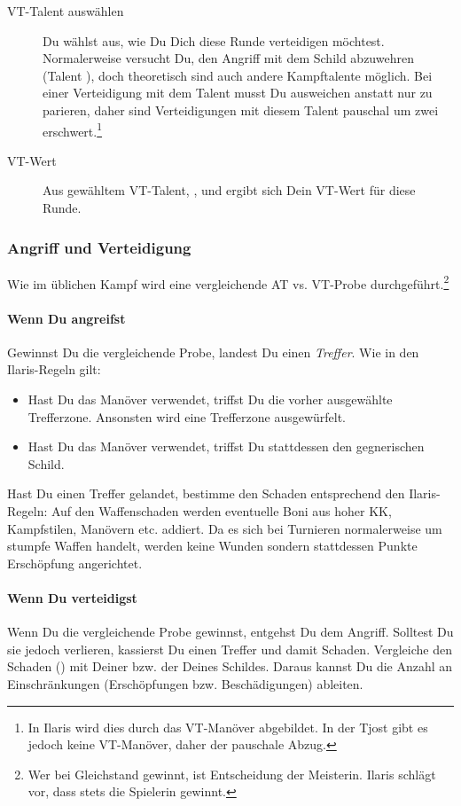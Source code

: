 \documentclass[12pt,div=calc,a5paper,parskip=half]{scrartcl}
\begin{document}
\begin{description}
    \item[VT-Talent auswählen] Du wählst aus, wie Du Dich diese Runde verteidigen möchtest. Normalerweise versucht Du, den Angriff mit dem Schild abzuwehren (Talent ), doch theoretisch sind auch andere Kampftalente möglich. Bei einer Verteidigung mit dem Talent  musst Du ausweichen anstatt nur zu parieren, daher sind Verteidigungen mit diesem Talent pauschal um zwei erschwert.\footnote{In Ilaris wird dies durch das VT-Manöver  abgebildet. In der Tjost gibt es jedoch keine VT-Manöver, daher der pauschale Abzug.}
    \item[VT-Wert] Aus gewähltem VT-Talent, ,  und \modVT ergibt sich Dein VT-Wert für diese Runde. 
\end{description}

\subsubsection{Angriff und Verteidigung}
Wie im üblichen Kampf wird eine vergleichende AT vs. VT-Probe durchgeführt.\footnote{Wer bei Gleichstand gewinnt, ist Entscheidung der Meisterin. Ilaris schlägt vor, dass stets die Spielerin gewinnt.} 

\paragraph{Wenn Du angreifst} Gewinnst Du die vergleichende Probe, landest Du einen \emph{Treffer}. Wie in den Ilaris-Regeln gilt:
\begin{itemize}
\item Hast Du das Manöver  verwendet, triffst Du die vorher ausgewählte Trefferzone. Ansonsten wird eine Trefferzone ausgewürfelt. 
\item Hast Du das Manöver  verwendet, triffst Du stattdessen den gegnerischen Schild.
\end{itemize}
Hast Du einen Treffer gelandet, bestimme den Schaden entsprechend den Ilaris-Regeln: Auf den Waffenschaden werden eventuelle Boni aus hoher KK, Kampfstilen, Manövern etc. addiert. Da es sich bei Turnieren normalerweise um stumpfe Waffen handelt, werden keine Wunden sondern stattdessen Punkte Erschöpfung angerichtet. 

\paragraph{Wenn Du verteidigst}
Wenn Du die vergleichende Probe gewinnst, entgehst Du dem Angriff. Solltest Du sie jedoch verlieren, kassierst Du einen Treffer und damit Schaden. Vergleiche den Schaden () mit Deiner \wsstern bzw. der  Deines Schildes. Daraus kannst Du die Anzahl an Einschränkungen (Erschöpfungen bzw. Beschädigungen) ableiten. 
\end{document}
